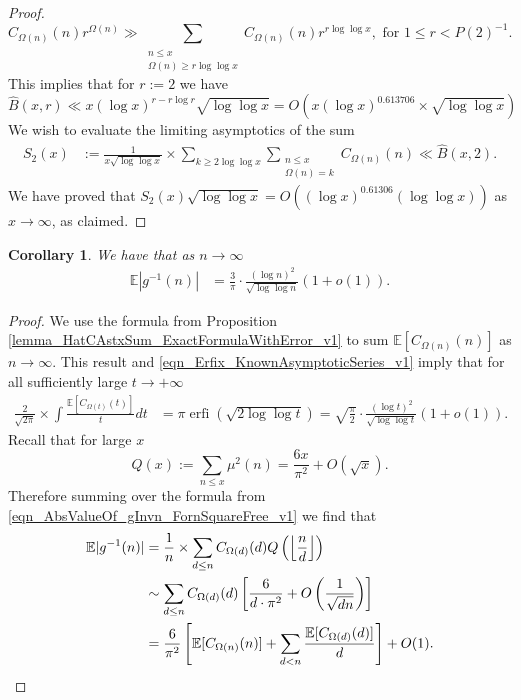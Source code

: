 \documentclass[11pt,reqno,a4letter]{article}
\numberwithin{figure}{section}
\numberwithin{table}{section}
\newcommand{\Floor}[2]{\ensuremath{\left\lfloor \frac{#1}{#2} \right\rfloor}}
\theoremstyle{plain}
\newtheorem{cor}[theorem]{Corollary}
\numberwithin{theorem}{section}
\theoremstyle{definition}
\begin{document}
\begin{proof}
\[     C_{\Omega(n)}(n) r^{\Omega(n)} \gg 
     \sum_{\substack{n \leq x \\ \Omega(n) \geq r\log\log x}} 
     C_{\Omega(n)}(n) r^{r \log\log x}, \text{\ for\ } 1 \leq r < P(2)^{-1}. 
\]
This implies that for $r := 2$ we have 
\begin{equation}
\label{eqn_BHatxrUpperBound_v1}
\widehat{B}(x, r) \ll x (\log x)^{r-r\log r} \sqrt{\log\log x} = 
     O\left(x (\log x)^{0.613706} \times \sqrt{\log\log x}\right)
\end{equation}
We wish to evaluate the limiting asymptotics of the sum 
\begin{align*}
S_2(x) & := \frac{1}{x \sqrt{\log\log x}} \times 
     \sum_{k \geq 2\log\log x} \sum_{\substack{n \leq x \\ \Omega(n)=k}} 
     C_{\Omega(n)}(n) \ll \widehat{B}(x, 2). 
\end{align*} 
We have proved that 
$S_2(x) \sqrt{\log\log x} = O\left((\log x)^{0.61306} (\log\log x)\right)$ 
as $x \rightarrow \infty$, as claimed. 
\end{proof} 

\begin{cor}
\label{cor_ExpectationFormulaAbsgInvn_v2} 
We have that as $n \rightarrow \infty$ 
\begin{align*} 
\mathbb{E}|g^{-1}(n)| & = \frac{3}{\pi} \cdot 
     \frac{(\log n)^2}{\sqrt{\log\log n}} (1+o(1)). 
\end{align*} 
\end{cor} 
\begin{proof} 
We use the formula from Proposition \ref{lemma_HatCAstxSum_ExactFormulaWithError_v1} 
to sum $\mathbb{E}[C_{\Omega(n)}(n)]$ as $n \rightarrow \infty$.
This result and \eqref{eqn_Erfix_KnownAsymptoticSeries_v1} 
imply that for all sufficiently large $t \rightarrow +\infty$ 
\begin{align*} 
\frac{2}{\sqrt{2\pi}} \times \int \frac{\mathbb{E}[C_{\Omega(t)}(t)]}{t} dt & = 
     \pi \operatorname{erfi}\left(\sqrt{2\log\log t}\right) = 
     \sqrt{\frac{\pi}{2}} \cdot \frac{(\log t)^2}{\sqrt{\log\log t}} (1+o(1)). 
\end{align*} 
Recall that for large $x$ 
\[
Q(x) := \sum_{n \leq x} \mu^2(n) = \frac{6x}{\pi^2} + O(\sqrt{x}). 
\]
Therefore summing over the formula from 
\eqref{eqn_AbsValueOf_gInvn_FornSquareFree_v1} we find that  
\begin{align} 
\notag 
\mathbb{E}|g^{-1}(n)| & = \frac{1}{n} \times \sum_{d \leq n} 
     C_{\Omega(d)}(d) Q\left(\Floor{n}{d}\right) \\ 
\notag 
     & \sim \sum_{d \leq n} C_{\Omega(d)}(d) \left[\frac{6}{d \cdot \pi^2} + O\left(\frac{1}{\sqrt{dn}}\right) 
     \right] \\ 
\notag 
     & = \frac{6}{\pi^2} \left[\mathbb{E}[C_{\Omega(n)}(n)] + \sum_{d<n} 
     \frac{\mathbb{E}[C_{\Omega(d)}(d)]}{d}\right] + O(1). 
     \qedhere 
\end{align} 
\end{proof} 
\end{document}
